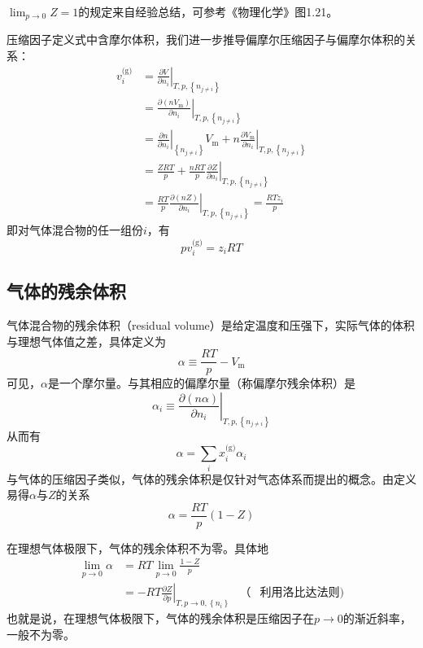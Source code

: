 \documentclass[main.tex]{subfiles}
\begin{document}
$\lim_{p\to 0}Z=1$的规定来自经验总结，可参考《物理化学》图1.21。

压缩因子定义式中含摩尔体积，我们进一步推导偏摩尔压缩因子与偏摩尔体积的关系：
\begin{align*}
    v_i^\text{(g)} & =\left.\frac{\partial V}{\partial n_i}\right|_{T,p,\left\{n_{j\neq i}\right\}}                                                                                               \\
                   & =\left.\frac{\partial\left(n V_\text{m}\right)}{\partial n_i}\right|_{T,p,\left\{n_{j\neq i}\right\}}                                                                        \\
                   & =\left.\frac{\partial n}{\partial n_i}\right|_{\left\{n_{j\neq i}\right\}}V_\text{m}+n\left.\frac{\partial V_\text{m}}{\partial n_i}\right|_{T,p,\left\{n_{j\neq i}\right\}} \\
                   & =\frac{ZRT}{p}+\frac{nRT}{p}\left.\frac{\partial Z}{\partial n_i}\right|_{T,p,\left\{n_{j\neq i}\right\}}                                                                    \\
                   & =\frac{RT}{p}\left.\frac{\partial\left(nZ\right)}{\partial n_i}\right|_{T,p,\left\{n_{j\neq i}\right\}}=\frac{RTz_i}{p}
\end{align*}
即对气体混合物的任一组份$i$，有
\[p v_i^\text{(g)}=z_iRT\]

\subsection{气体的残余体积}
气体混合物的残余体积（residual volume）是给定温度和压强下，实际气体的体积与理想气体值之差，具体定义为
\[\alpha\equiv \frac{RT}{p}-V_\text{m}\]
可见，$\alpha$是一个摩尔量。与其相应的偏摩尔量（称偏摩尔残余体积）是
\[\alpha_i\equiv\left.\frac{\partial\left(n\alpha\right)}{\partial n_i}\right|_{T,p,\left\{n_{j\neq i}\right\}}\]
从而有
\[\alpha=\sum_i x_i^\text{(g)}\alpha_i\]
与气体的压缩因子类似，气体的残余体积是仅针对气态体系而提出的概念。由定义易得$\alpha$与$Z$的关系
\[\alpha=\frac{RT}{p}\left(1-Z\right)\]

在理想气体极限下，气体的残余体积不为零。具体地
\begin{align*}
    \lim_{p\to 0}\alpha & =RT\lim_{p\to 0}\frac{1-Z}{p}                                                                             \\
                        & =-RT\left.\frac{\partial Z}{\partial p}\right|_{T,p\to 0,\left\{n_i\right\}} & \text{（} & \text{利用洛比达法则)}
\end{align*}
也就是说，在理想气体极限下，气体的残余体积是压缩因子在$p\to 0$的渐近斜率，一般不为零。
\end{document}
